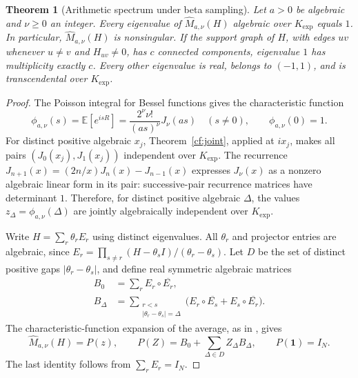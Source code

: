 \documentclass[11pt]{article}
\newtheorem{theorem}{Theorem}[section]
\theoremstyle{definition}
\theoremstyle{remark}
\newcommand{\Kexp}{K_{\mathrm{exp}}}
\newcommand{\Ex}{\mathbb E}
\begin{document}
\begin{theorem}[Arithmetic spectrum under beta sampling]
\label{qmix:main}
Let $a>0$ be algebraic and $\nu\ge0$ an integer. Every eigenvalue of
$\widehat M_{a,\nu}(H)$ algebraic over $\Kexp$ equals $1$.
In particular, $\widehat M_{a,\nu}(H)$ is nonsingular.
If the support graph of $H$, with edges $uv$ whenever $u\ne v$ and
$H_{uv}\ne0$, has $c$ connected components, eigenvalue $1$ has
multiplicity exactly $c$. Every other eigenvalue is real, belongs to
$(-1,1)$, and is transcendental over $\Kexp$.
\end{theorem}

\begin{proof}
The Poisson integral for Bessel functions \cite[\S10.9]{DLMF} gives
the characteristic function
\begin{equation}
\label{qmix:characteristic}
 \phi_{a,\nu}(s)=\Ex[e^{isR}]
 =\frac{2^\nu\nu!}{(as)^\nu}J_\nu(as)\quad(s\ne0),
 \qquad \phi_{a,\nu}(0)=1.
\end{equation}
For distinct positive algebraic $x_j$, Theorem~\ref{cf:joint}, applied
at $ix_j$, makes all pairs $(J_0(x_j),J_1(x_j))$ independent over
$\Kexp$. The recurrence
$J_{n+1}(x)=(2n/x)J_n(x)-J_{n-1}(x)$ expresses $J_\nu(x)$ as a
nonzero algebraic linear form in its pair: successive-pair recurrence
matrices have determinant $1$. Therefore, for distinct positive
algebraic $\Delta$, the values $z_\Delta=\phi_{a,\nu}(\Delta)$ are
jointly algebraically independent over $\Kexp$.

Write $H=\sum_r\theta_rE_r$ using distinct eigenvalues. All $\theta_r$
and projector entries are algebraic, since
$E_r=\prod_{s\ne r}(H-\theta_sI)/(\theta_r-\theta_s)$.
Let $D$ be the set of distinct positive gaps $|\theta_r-\theta_s|$,
and define real symmetric algebraic matrices
\begin{align*}
 B_0&=\sum_r E_r\circ\overline{E_r},\\
 B_\Delta&=\sum_{\substack{r<s\\|\theta_r-\theta_s|=\Delta}}
 \bigl(E_r\circ\overline{E_s}+E_s\circ\overline{E_r}\bigr).
\end{align*}
The characteristic-function expansion of the average, as in
\cite[Proposition~13]{BCM2024}, gives
\begin{equation}
\label{qmix:formal}
 \widehat M_{a,\nu}(H)=P(z),\qquad
 P(Z)=B_0+\sum_{\Delta\in D}Z_\Delta B_\Delta,
 \qquad P(\mathbf1)=I_N.
\end{equation}
The last identity follows from $\sum_rE_r=I_N$.


\end{proof}
\end{document}
